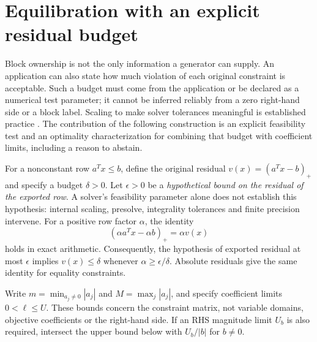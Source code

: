 \section{Equilibration with an explicit residual budget}
\label{sec:contract}

Block ownership is not the only information a generator can supply. An application
can also state how much violation of each original constraint is acceptable. Such a
budget must come from the application or be declared as a numerical test parameter;
it cannot be inferred reliably from a zero right-hand side or a block label. Scaling
to make solver tolerances meaningful is established practice
\cite{gurobiScaling,idaesScaling}. The contribution of the following construction is
an explicit feasibility test and an optimality characterization for combining that
budget with coefficient limits, including a reason to abstain.

For a nonconstant row $a^Tx\le b$, define the original residual
$v(x)=(a^Tx-b)_+$ and specify a budget $\delta>0$. Let $\epsilon>0$ be a
\emph{hypothetical bound on the residual of the exported row}. A solver's feasibility
parameter alone does not establish this hypothesis: internal scaling, presolve,
integrality tolerances and finite precision intervene. For a positive row factor
$\alpha$, the identity
\begin{equation}\label{eq:residual-transfer}
 (\alpha a^Tx-\alpha b)_+=\alpha v(x)
\end{equation}
holds in exact arithmetic. Consequently, the hypothesis of exported residual at
most $\epsilon$ implies $v(x)\le\delta$ whenever $\alpha\ge\epsilon/\delta$.
Absolute residuals give the same identity for equality constraints.

Write $m=\min_{a_j\ne0}|a_j|$ and $M=\max_j|a_j|$, and specify coefficient
limits $0<\ell\le U$. These bounds concern the constraint matrix, not variable
domains, objective coefficients or the right-hand side. If an RHS magnitude limit
$U_b$ is also required, intersect the upper bound below with $U_b/|b|$ for $b\ne0$.

